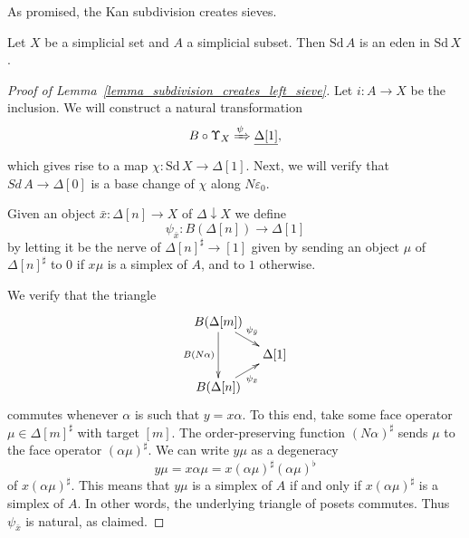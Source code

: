 As promised, the Kan subdivision creates sieves.
\begin{lemma}\label{lemma_subdivision_creates_left_sieve}
Let $X$ be a simplicial set and $A$ a simplicial subset. Then $\textrm{Sd} \, A$ is an eden in $\textrm{Sd} \, X$.
\end{lemma}
\begin{proof}[Proof of Lemma~\ref{lemma_subdivision_creates_left_sieve}]
Let $i:A\to X$ be the inclusion. We will construct a natural transformation
\[B\circ \Upsilon _X\xRightarrow{\psi } \underline{\Delta [1]},\]
which gives rise to a map $\chi :\textrm{Sd} \,X\to \Delta [1]$. Next, we will verify that $Sd\, A\to \Delta [0]$ is a base change of $\chi$ along $N\varepsilon _0$.

Given an object $\bar{x} :\Delta [n]\to X$ of $\Delta \downarrow X$ we define
\[\psi _{\bar{x} }:B(\Delta [n])\to \Delta [1]\]
by letting it be the nerve of $\Delta [n]^\sharp \to [1]$ given by sending an object $\mu$ of $\Delta [n]^\sharp$ to $0$ if $x\mu$ is a simplex of $A$, and to $1$ otherwise.

We verify that the triangle
\begin{displaymath}
\xymatrix@=1em{
 B(\Delta [m]) \ar[dd]_{B(N\alpha )} \ar[dr]^{\psi _{\bar{y} }} \\
 & \Delta [1] \\
 B(\Delta [n]) \ar[ur]_{\psi _{\bar{x} }}
 }
\end{displaymath}
commutes whenever $\alpha$ is such that $y=x\alpha$. To this end, take some face operator $\mu \in \Delta [m]^\sharp$ with target $[m]$. The order-preserving function $(N\alpha )^\sharp$ sends $\mu$ to the face operator $(\alpha \mu )^\sharp$. We can write $y\mu$ as a degeneracy
\[y\mu =x\alpha \mu =x(\alpha \mu )^\sharp (\alpha \mu )^\flat\]
of $x(\alpha \mu )^\sharp$. This means that $y\mu$ is a simplex of $A$ if and only if $x(\alpha \mu )^\sharp$ is a simplex of $A$. In other words, the underlying triangle of posets commutes. Thus $\psi _{\bar{x} }$ is natural, as claimed.


\end{proof}
